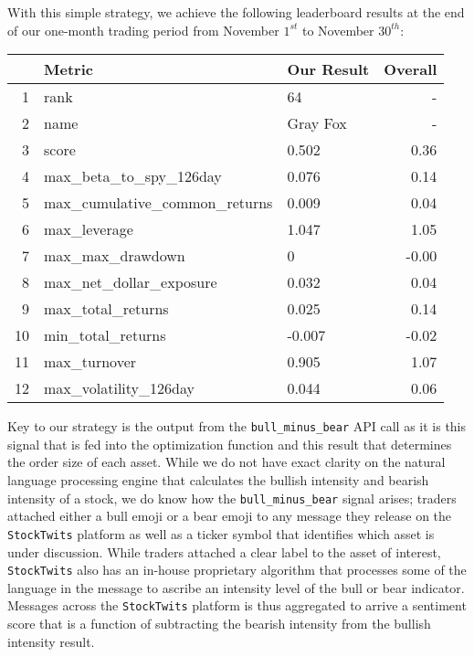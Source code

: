 \documentclass[11pt,]{article}
\begin{document}
With this simple strategy, we achieve the following leaderboard results
at the end of our one-month trading period from November \(1^{st}\) to
November \(30^{th}\):

\newpage

\begin{table}[ht]
\small
\centering
\begin{tabular}{rllr}
  \hline
 & Metric & Our Result & Overall \\ 
  \hline
1 & rank & 64 & - \\ 
  2 & name & Gray Fox & - \\ 
  3 & score & 0.502 & 0.36 \\ 
  4 & max\_beta\_to\_spy\_126day & 0.076 & 0.14 \\ 
  5 & max\_cumulative\_common\_returns & 0.009 & 0.04 \\ 
  6 & max\_leverage & 1.047 & 1.05 \\ 
  7 & max\_max\_drawdown & 0 & -0.00 \\ 
  8 & max\_net\_dollar\_exposure & 0.032 & 0.04 \\ 
  9 & max\_total\_returns & 0.025 & 0.14 \\ 
  10 & min\_total\_returns & -0.007 & -0.02 \\ 
  11 & max\_turnover & 0.905 & 1.07 \\ 
  12 & max\_volatility\_126day & 0.044 & 0.06 \\ 
   \hline
\end{tabular}
\end{table}

Key to our strategy is the output from the \texttt{bull\_minus\_bear}
API call as it is this signal that is fed into the optimization function
and this result that determines the order size of each asset. While we
do not have exact clarity on the natural language processing engine that
calculates the bullish intensity and bearish intensity of a stock, we do
know how the \texttt{bull\_minus\_bear} signal arises; traders attached
either a bull emoji or a bear emoji to any message they release on the
\texttt{StockTwits} platform as well as a ticker symbol that identifies
which asset is under discussion. While traders attached a clear label to
the asset of interest, \texttt{StockTwits} also has an in-house
proprietary algorithm that processes some of the language in the message
to ascribe an intensity level of the bull or bear indicator. Messages
across the \texttt{StockTwits} platform is thus aggregated to arrive a
sentiment score that is a function of subtracting the bearish intensity
from the bullish intensity result.
\end{document}
